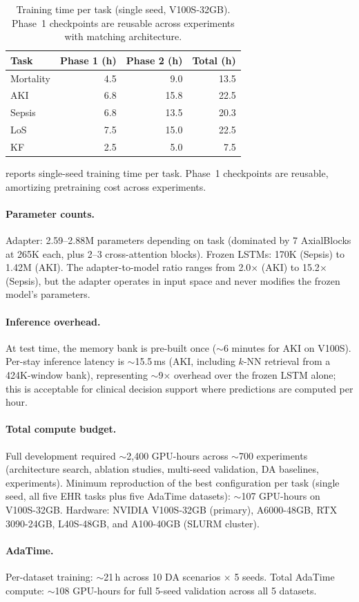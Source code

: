 \begin{table}[t]
\centering
\caption{Training time per task (single seed, V100S-32GB). Phase~1 checkpoints are reusable across experiments with matching architecture.}
\label{tab:compute}
\small
\begin{tabular}{@{}lrrr@{}}
\toprule
\textbf{Task} & \textbf{Phase 1 (h)} & \textbf{Phase 2 (h)} & \textbf{Total (h)} \\
\midrule
Mortality & 4.5  & 9.0  & 13.5 \\
AKI       & 6.8  & 15.8 & 22.5 \\
Sepsis    & 6.8  & 13.5 & 20.3 \\
LoS       & 7.5  & 15.0 & 22.5 \\
KF        & 2.5  & 5.0  & 7.5 \\
\bottomrule
\end{tabular}
\end{table}

 reports single-seed training time per task. Phase~1 checkpoints are reusable, amortizing pretraining cost across experiments.

\paragraph{Parameter counts.}
Adapter: 2.59--2.88M parameters depending on task (dominated by 7 AxialBlocks at 265K each, plus 2--3 cross-attention blocks).
Frozen LSTMs: 170K (Sepsis) to 1.42M (AKI).
The adapter-to-model ratio ranges from 2.0$\times$ (AKI) to 15.2$\times$ (Sepsis), but the adapter operates in input space and never modifies the frozen model's parameters.

\paragraph{Inference overhead.}
At test time, the memory bank is pre-built once ($\sim$6 minutes for AKI on V100S).
Per-stay inference latency is $\sim$15.5\,ms (AKI, including $k$-NN retrieval from a 424K-window bank), representing $\sim$9$\times$ overhead over the frozen LSTM alone; this is acceptable for clinical decision support where predictions are computed per hour.

\paragraph{Total compute budget.}
Full development required $\sim$2,400 GPU-hours across $\sim$700 experiments (architecture search, ablation studies, multi-seed validation, DA baselines, \hirid{} experiments).
Minimum reproduction of the best configuration per task (single seed, all five EHR tasks plus five AdaTime datasets): $\sim$107 GPU-hours on V100S-32GB.
Hardware: NVIDIA V100S-32GB (primary), A6000-48GB, RTX 3090-24GB, L40S-48GB, and A100-40GB (SLURM cluster).

\paragraph{AdaTime.}
Per-dataset training: $\sim$21\,h across 10 DA scenarios $\times$ 5 seeds.
Total AdaTime compute: $\sim$108 GPU-hours for full 5-seed validation across all 5 datasets.
